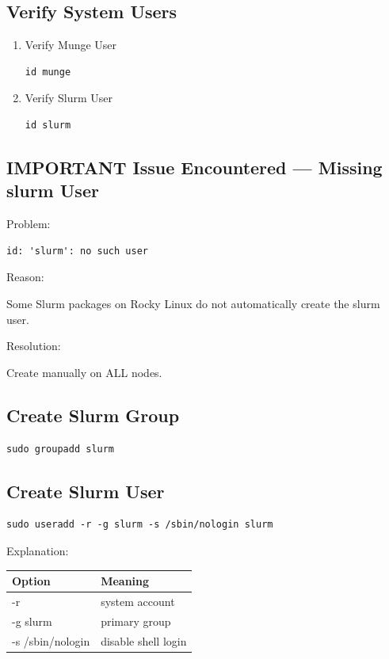 \documentclass[11pt]{article}
\begin{document}
\subsection{Verify System Users}
\label{sec:orgb6ab0c0}
\begin{enumerate}
\item Verify Munge User
\label{sec:org758b5c5}

\begin{verbatim}
id munge
\end{verbatim}
\item Verify Slurm User
\label{sec:org94453d4}

\begin{verbatim}
id slurm
\end{verbatim}
\end{enumerate}
\subsection{IMPORTANT Issue Encountered — Missing slurm User}
\label{sec:org2153c69}

Problem:

\begin{verbatim}
id: 'slurm': no such user
\end{verbatim}

Reason:

Some Slurm packages on Rocky Linux do not automatically create the slurm user.

Resolution:

Create manually on ALL nodes.
\subsection{Create Slurm Group}
\label{sec:org4e36c2f}

\begin{verbatim}
sudo groupadd slurm
\end{verbatim}
\subsection{Create Slurm User}
\label{sec:orgfdbf49b}

\begin{verbatim}
sudo useradd -r -g slurm -s /sbin/nologin slurm
\end{verbatim}

Explanation:

\begin{center}
\begin{tabular}{ll}
Option & Meaning\\
\hline
-r & system account\\
-g slurm & primary group\\
-s /sbin/nologin & disable shell login\\
\end{tabular}
\end{center}
\end{document}
